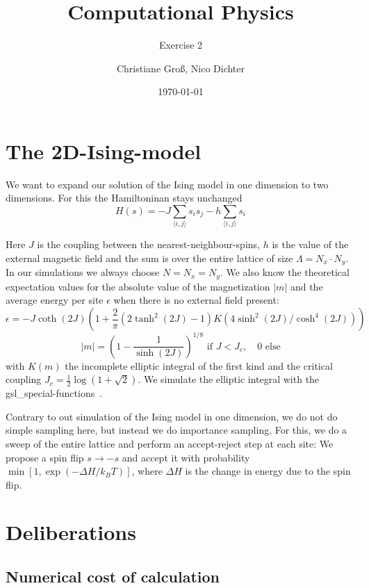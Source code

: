 \documentclass{scrartcl}
\title{Computational Physics}
\subtitle{Exercise 2}
\date{\today}
\author{Christiane Groß, Nico Dichter}
\begin{document}
	\maketitle
\section{The 2D-Ising-model}
We want to expand our solution of the Ising model in one dimension to two dimensions. For this the Hamiltoninan stays unchanged 
\begin{equation}
H(s)=-J\sum_{\langle i,j\rangle }s_is_j-h\sum_{\langle i,j\rangle }s_i
\label{eq:hamiltonianising}
\end{equation}

Here $J$ is the coupling between the nearest-neighbour-spins, $h$ is the value of the external magnetic field and the sum is over the entire lattice of size $\Lambda=N_x \cdot N_y$. In our simulations we always choose $N=N_x=N_y$.
We also know the theoretical expectation values for the  absolute value of the magnetization $|m|$ and the average energy per site $\epsilon$ when there is no external field present:
\begin{equation}
\epsilon=-J\coth(2J)\left( 1+\frac{2}{\pi}(2\tanh^2(2J)-1)K(4\sinh^2(2J)/\cosh^4(2J))\right) 
\end{equation}
\begin{equation}
|m|=\left( 1-\frac{1}{\sinh(2J)}\right)^{1/8} \text{ if } J<J_c,\quad 0 \text{ else}   
\end{equation}
 with $K(m)$ the incomplete elliptic integral of the first kind and the critical coupling $J_c=\frac{1}{2}\log(1+\sqrt{2})$. We simulate the elliptic integral with the gsl\_special-functions~\cite{gsldoc_sf}.
 
 Contrary to out simulation of the Ising model in one dimension, we do not do simple sampling here, but instead we do importance sampling. For this, we do a sweep of the entire lattice and perform an accept-reject step at each site: We propose a spin flip $s\rightarrow-s$ and accept it with probability $\min \left[1, \exp(-\Delta H/k_BT)\right]$, where $\Delta H$ is the change in energy due to the spin flip.  

\section{Deliberations}
\subsection{Numerical cost of calculation}
\end{document}
